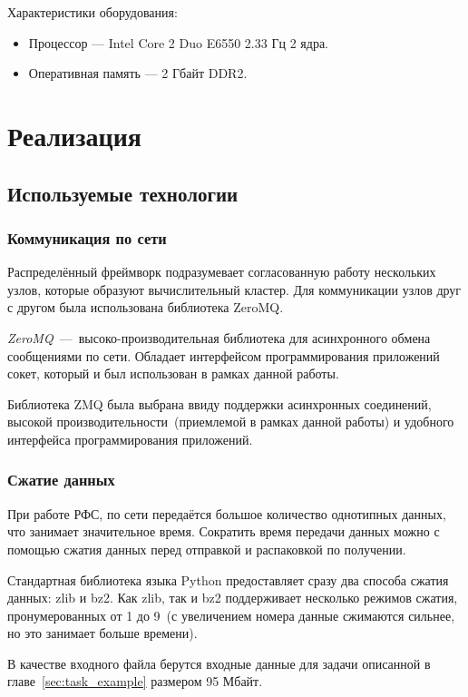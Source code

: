\documentclass[12pt,a4paper,oneside]{extarticle}
\begin{document}
        \noindent Характеристики оборудования:
        \begin{itemize}
            \item Процессор --- Intel Core 2 Duo E6550 2.33 Гц 2 ядра.
            \item Оперативная память --- 2 Гбайт DDR2.
        \end{itemize}
\clearpage

\section{Реализация}
    \subsection{Используемые технологии}
        \subsubsection{Коммуникация по сети}
            Распределённый фреймворк подразумевает согласованную работу нескольких узлов, которые образуют вычислительный кластер. Для коммуникации узлов друг с другом была использована библиотека ZeroMQ.

            {\it ZeroMQ}~---~высоко-производительная библиотека для асинхронного обмена сообщениями по сети. Обладает интерфейсом программирования приложений сокет, который и был использован в рамках данной работы.

            Библиотека ZMQ была выбрана ввиду поддержки асинхронных соединений, высокой производительности~(приемлемой в рамках данной работы) и удобного интерфейса программирования приложений.

        \subsubsection{Сжатие данных}
            При работе РФС, по сети передаётся большое количество однотипных данных, что занимает значительное время. Сократить время передачи данных можно с помощью сжатия данных перед отправкой и распаковкой по получении.

            Стандартная библиотека языка Python предоставляет сразу два способа сжатия данных: zlib и bz2. Как zlib, так и bz2 поддерживает несколько режимов сжатия, пронумерованных от 1 до 9~(с увеличением номера данные сжимаются сильнее, но это занимает больше времени).

            В качестве входного файла берутся входные данные для задачи описанной в главе~\ref{sec:task_example} размером 95 Мбайт.
\end{document}
